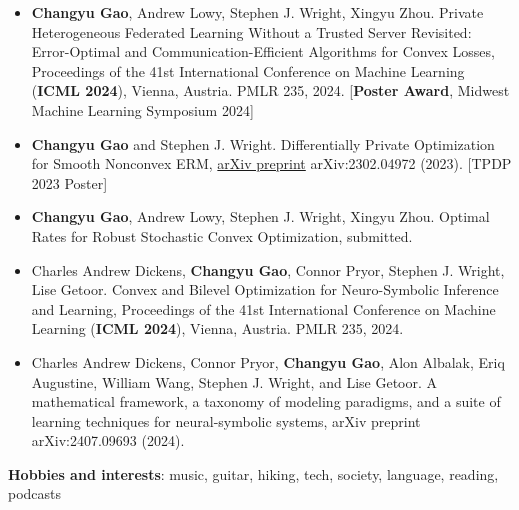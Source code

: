 \documentclass[letterpaper,12pt]{article}
\begin{document}
\begin{itemize}[leftmargin=*, label={}]
  \item
    \textbf{Changyu Gao}, Andrew Lowy, Stephen J. Wright, Xingyu Zhou. Private Heterogeneous Federated Learning Without a Trusted Server Revisited: Error-Optimal and Communication-Efficient Algorithms for Convex Losses, Proceedings of the 41st International Conference on Machine Learning (\textbf{ICML 2024}), Vienna, Austria. PMLR 235, 2024. [\textbf{Poster Award}, Midwest Machine Learning Symposium 2024]

  \item \textbf{Changyu Gao} and Stephen J. Wright. Differentially Private Optimization for Smooth Nonconvex ERM,
    \href{https://arxiv.org/abs/2302.04972}{arXiv preprint} arXiv:2302.04972 (2023). [TPDP 2023 Poster]

  \item \textbf{Changyu Gao}, Andrew Lowy, Stephen J. Wright, Xingyu Zhou. Optimal Rates for Robust Stochastic Convex Optimization, submitted.

  \item
    Charles Andrew Dickens, \textbf{Changyu Gao}, Connor Pryor, Stephen J. Wright, Lise Getoor.
    Convex and Bilevel Optimization for Neuro-Symbolic Inference and Learning, Proceedings of the 41st International Conference on Machine Learning (\textbf{ICML 2024}), Vienna, Austria. PMLR 235, 2024.
  
  \item Charles Andrew Dickens, Connor Pryor, \textbf{Changyu Gao}, Alon Albalak, Eriq Augustine, William Wang, Stephen J. Wright, and Lise Getoor. A mathematical framework, a taxonomy of modeling paradigms, and a suite of learning techniques for neural-symbolic systems, arXiv preprint arXiv:2407.09693 (2024).
\end{itemize}
\vspace{0.2cm}
\textbf{Hobbies and interests}: music, guitar, hiking, tech, society, language, reading, podcasts
\end{document}
